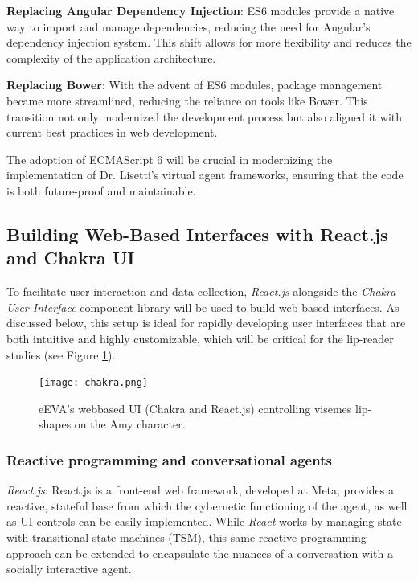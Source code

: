 \documentclass[12pt]{article}
\begin{document}
\textbf{Replacing Angular Dependency Injection}: ES6 modules provide a native way to import and manage dependencies, reducing the need for Angular’s dependency injection system. This shift allows for more flexibility and reduces the complexity of the application architecture.

\textbf{Replacing Bower}: With the advent of ES6 modules, package management became more streamlined, reducing the reliance on tools like Bower. This transition not only modernized the development process but also aligned it with current best practices in web development.

The adoption of ECMAScript 6 will be  crucial in modernizing the implementation of Dr. Lisetti’s virtual agent frameworks, ensuring that the code is both future-proof and maintainable.

\subsection{Building Web-Based Interfaces with React.js and Chakra UI}

To facilitate user interaction and data collection, {\em React.js} alongside the {\em Chakra User Interface} component library will be used to build web-based interfaces. As discussed below, this setup is ideal for rapidly developing user interfaces that are both intuitive and highly customizable, which will be critical for the lip-reader studies (see Figure \ref{fig:chakra}).

\begin{figure}
    \centering
    \vspace{-3mm}
    \texttt{[image: chakra.png]}
    \caption{eEVA's webbased UI (Chakra and React.js) controlling visemes lip-shapes on the Amy character. }
    \label{fig:chakra}
\end{figure}
\subsubsection{Reactive programming and conversational agents} 

\textit{React.js}: React.js is a front-end web framework, developed at Meta, provides a reactive, stateful base from which the cybernetic functioning of the agent, as well as UI controls can be easily implemented.
While {\em React} works by managing state with transitional state machines (TSM), this same reactive programming approach can be extended to encapsulate the nuances of a conversation with a socially interactive agent. 
\end{document}

